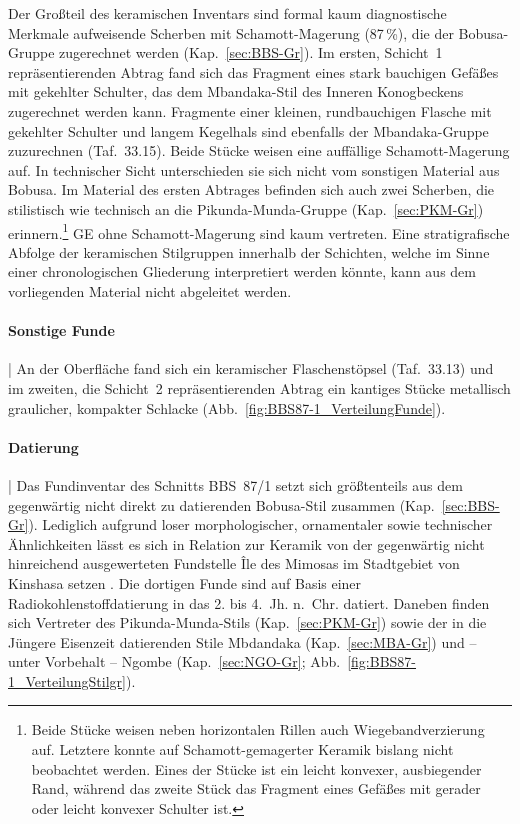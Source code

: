 Der Großteil des keramischen Inventars sind formal kaum diagnostische Merkmale aufweisende Scherben mit Schamott-Magerung (87\,\%), die der Bobusa-Gruppe zugerechnet werden (Kap.~\ref{sec:BBS-Gr}). Im ersten, Schicht~1 repräsentierenden Abtrag fand sich das Fragment eines stark bauchigen Gefäßes mit gekehlter Schulter, das dem Mbandaka-Stil des Inneren Konogbeckens \parencite[139--143; Kap.~\ref{sec:MBA-Gr}]{Wotzka.1995} zugerechnet werden kann. Fragmente einer kleinen, rundbauchigen Flasche mit gekehlter Schulter und langem Kegelhals sind ebenfalls der Mbandaka-Gruppe zuzurechnen (Taf.~33.15). Beide Stücke weisen eine auffällige Schamott-Magerung auf. In technischer Sicht unterschieden sie sich nicht vom sonstigen Material aus Bobusa. Im Material des ersten Abtrages befinden sich auch zwei Scherben, die stilistisch wie technisch an die Pikunda-Munda-Gruppe (Kap.~\ref{sec:PKM-Gr}) erinnern.\footnote{Beide Stücke weisen neben horizontalen Rillen auch Wiegebandverzierung auf. Letztere konnte auf Schamott-gemagerter Keramik bislang nicht beobachtet werden. Eines der Stücke ist ein leicht konvexer, ausbiegender Rand, während das zweite Stück das Fragment eines Gefäßes mit gerader oder leicht konvexer Schulter ist.} GE ohne Schamott-Magerung sind kaum vertreten. Eine stratigrafische Abfolge der keramischen Stilgruppen innerhalb der Schichten, welche im Sinne einer chronologischen Gliederung interpretiert werden könnte, kann aus dem vorliegenden Material nicht abgeleitet werden.

\paragraph{Sonstige Funde}\hspace{-.5em}|\hspace{.5em}%
An der Oberfläche fand sich ein keramischer Flaschenstöpsel (Taf.~33.13) und im zweiten, die Schicht~2 repräsentierenden Abtrag ein kantiges Stücke metallisch graulicher, kompakter Schlacke (Abb.~\ref{fig:BBS87-1_VerteilungFunde}).

\paragraph{Datierung}\hspace{-.5em}|\hspace{.5em}%
Das Fundinventar des Schnitts BBS~87/1 setzt sich größtenteils aus dem gegenwärtig nicht direkt zu datierenden Bobusa-Stil zusammen (Kap.~\ref{sec:BBS-Gr}). Lediglich aufgrund loser morphologischer, ornamentaler sowie technischer Ähnlichkeiten lässt es sich in Relation zur Keramik von der gegenwärtig nicht hinreichend ausgewerteten Fundstelle Île des Mimosas im Stadtgebiet von Kinshasa setzen \parencite[siehe][279\,f.]{Eggert.1984}. Die dortigen Funde sind auf Basis einer Radiokohlenstoffdatierung in das 2. bis 4.~Jh. n.~Chr. datiert. Daneben finden sich Vertreter des Pikunda-Munda-Stils (Kap.~\ref{sec:PKM-Gr}) sowie der in die Jüngere Eisenzeit datierenden Stile Mbdandaka (Kap.~\ref{sec:MBA-Gr}) und -- unter Vorbehalt -- Ngombe (Kap.~\ref{sec:NGO-Gr}; Abb.~\ref{fig:BBS87-1_VerteilungStilgr}). 

